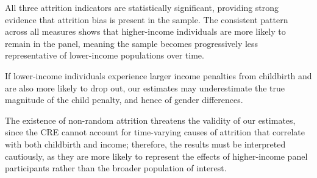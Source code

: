 All three attrition indicators are statistically significant, providing strong evidence that attrition bias is present in the sample. The consistent pattern across all measures shows that higher-income individuals are more likely to remain in the panel, meaning the sample becomes progressively less representative of lower-income populations over time. 

If lower-income individuals experience larger income penalties from childbirth and are also more likely to drop out, our estimates may underestimate the true magnitude of the child penalty, and hence of gender differences.

The existence of non-random attrition threatens the validity of our estimates, since the CRE cannot account for time-varying causes of attrition that correlate with both childbirth and income; therefore, the results must be interpreted cautiously, as they are more likely to represent the effects of higher-income panel participants rather than the broader population of interest.


